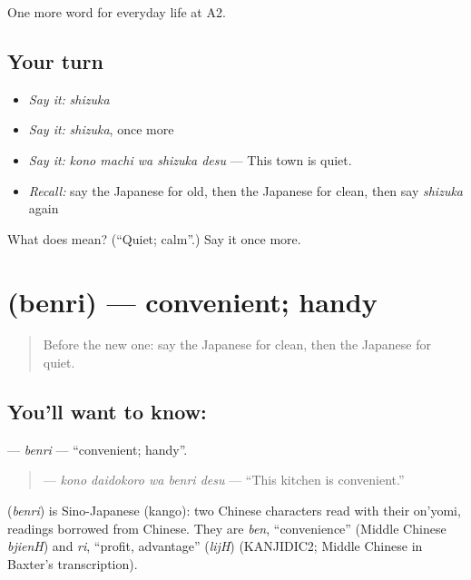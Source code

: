 \begin{grammarlens}[title={What you've built}]
One more word for everyday life at A2.
\end{grammarlens}

\subsection*{Your turn}
\begin{itemize}
\raggedright
  \item \emph{Say it:} \emph{shizuka}
  \item \emph{Say it:} \emph{shizuka}, once more
  \item \emph{Say it:} \emph{kono machi wa shizuka desu} — This town is quiet.
  \item \emph{Recall:} say the Japanese for old, then the Japanese for clean, then say \emph{shizuka} again
\end{itemize}

\begin{tcolorbox}[breakable,colback=teal!4,colframe=teal!35!black,title={Before you move on}]
What does  mean? (\textquotedblleft{}Quiet; calm\textquotedblright{}.) Say it once more.
\end{tcolorbox}
\section[\texorpdfstring{\ja{べんり} (benri)}{べんり (benri)}]{ (benri) — convenient; handy}

\label{lesson:JA-C163-benri}



\begin{quote}
Before the new one: say the Japanese for clean, then the Japanese for quiet.
\end{quote}

\subsection*{You'll want to know: }
\textbf{} — \emph{benri} — \textquotedblleft{}convenient; handy\textquotedblright{}.

\begin{quote}
\textbf{  } — \emph{kono daidokoro wa benri desu} — \textquotedblleft{}This kitchen is convenient.\textquotedblright{}
\end{quote}

\begin{cousinweb}
\textbf{} (\emph{benri}) is Sino-Japanese (kango): two Chinese characters read with their on'yomi, readings borrowed from Chinese. They are \emph{ben}, \textquotedblleft{}convenience\textquotedblright{} (Middle Chinese \emph{bjienH}) and \emph{ri}, \textquotedblleft{}profit, advantage\textquotedblright{} (\emph{lijH}) (KANJIDIC2; Middle Chinese in Baxter's transcription).
\end{cousinweb}

